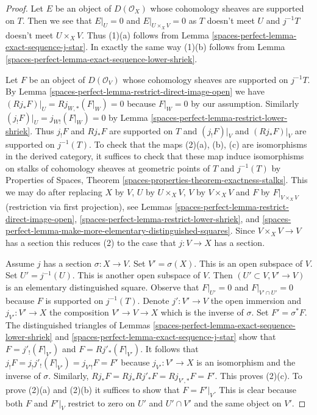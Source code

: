 \begin{proof}
Let $E$ be an object of $D(\mathcal{O}_X)$ whose cohomology sheaves are
supported on $T$. Then we see that $E|_U = 0$ and $E|_{U \times_X V} = 0$
as $T$ doesn't meet $U$ and $j^{-1}T$ doesn't meet $U \times_X V$.
Thus (1)(a) follows from Lemma \ref{spaces-perfect-lemma-exact-sequence-j-star}.
In exactly the same way (1)(b) follows from
Lemma \ref{spaces-perfect-lemma-exact-sequence-lower-shriek}.

\medskip\noindent
Let $F$ be an object of $D(\mathcal{O}_V)$ whose cohomology sheaves
are supported on $j^{-1}T$. By
Lemma \ref{spaces-perfect-lemma-restrict-direct-image-open} we have
$(Rj_*F)|_U = Rj_{W, *}(F|_W) = 0$ because $F|_W = 0$ by our assumption.
Similarly $(j_!F)|_U = j_{W!}(F|_W) = 0$ by
Lemma \ref{spaces-perfect-lemma-restrict-lower-shriek}.
Thus $j_!F$ and $Rj_*F$ are
supported on $T$ and $(j_!F)|_V$ and $(Rj_*F)|_V$ are supported on
$j^{-1}(T)$. To check that the maps (2)(a), (b), (c) are isomorphisms
in the derived category, it suffices to check that these map induce
isomorphisms on stalks of cohomology sheaves at geometric points of $T$
and $j^{-1}(T)$ by
Properties of Spaces, Theorem
\ref{spaces-properties-theorem-exactness-stalks}.
This we may do after replacing $X$ by $V$, $U$ by $U \times_X V$,
$V$ by $V \times_X V$ and $F$ by $F|_{V \times_X V}$ (restriction via
first projection), see
Lemmas \ref{spaces-perfect-lemma-restrict-direct-image-open},
\ref{spaces-perfect-lemma-restrict-lower-shriek}, and
\ref{spaces-perfect-lemma-make-more-elementary-distinguished-squares}.
Since $V \times_X V \to V$ has a section this
reduces (2) to the case that $j : V \to X$ has a section.

\medskip\noindent
Assume $j$ has a section $\sigma : X \to V$.
Set $V' = \sigma(X)$. This is an open subspace of $V$.
Set $U' = j^{-1}(U)$. This is another open subspace of $V$.
Then $(U' \subset V, V' \to V)$ is an elementary distinguished
square. Observe that $F|_{U'} = 0$ and $F|_{V' \cap U'} = 0$
because $F$ is supported on $j^{-1}(T)$. Denote $j' : V' \to V$
the open immersion and $j_{V'} : V' \to X$ the composition
$V' \to V \to X$ which is the inverse of $\sigma$.
Set $F' = \sigma^*F$. The distinguished triangles of
Lemmas \ref{spaces-perfect-lemma-exact-sequence-lower-shriek} and
\ref{spaces-perfect-lemma-exact-sequence-j-star} show that
$F = j'_!(F|_{V'})$ and $F = Rj'_*(F|_{V'})$.
It follows that $j_!F = j_!j'_!(F|_{V'}) = j_{V'!}F = F'$
because $j_{V'} : V' \to X$ is an isomorphism and the inverse
of $\sigma$. Similarly, $Rj_*F = Rj_*Rj'_*F = Rj_{V', *}F = F'$.
This proves (2)(c). To prove (2)(a) and (2)(b) it suffices
to show that $F = F'|_V$. This is clear because both $F$ and $F'|_V$
restrict to zero on $U'$ and $U' \cap V'$ and the same object
on $V'$.
\end{proof}

